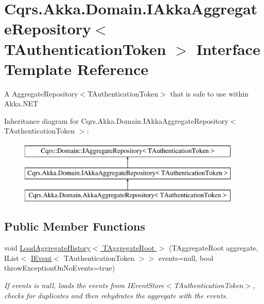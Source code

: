 \hypertarget{interfaceCqrs_1_1Akka_1_1Domain_1_1IAkkaAggregateRepository}{}\section{Cqrs.\+Akka.\+Domain.\+I\+Akka\+Aggregate\+Repository$<$ T\+Authentication\+Token $>$ Interface Template Reference}
\label{interfaceCqrs_1_1Akka_1_1Domain_1_1IAkkaAggregateRepository}


A Aggregate\+Repository$<$\+T\+Authentication\+Token$>$ that is safe to use within Akka.\+N\+ET  


Inheritance diagram for Cqrs.\+Akka.\+Domain.\+I\+Akka\+Aggregate\+Repository$<$ T\+Authentication\+Token $>$\+:\begin{figure}[H]
\begin{center}
\leavevmode
\includegraphics[height=3.000000cm]{interfaceCqrs_1_1Akka_1_1Domain_1_1IAkkaAggregateRepository}
\end{center}
\end{figure}
\subsection*{Public Member Functions}
\begin{DoxyCompactItemize}
\item 
void \hyperlink{interfaceCqrs_1_1Akka_1_1Domain_1_1IAkkaAggregateRepository_a9010b259daf5d09f7269277361015ddf_a9010b259daf5d09f7269277361015ddf}{Load\+Aggregate\+History$<$ T\+Aggregate\+Root $>$} (T\+Aggregate\+Root aggregate, I\+List$<$ \hyperlink{interfaceCqrs_1_1Events_1_1IEvent}{I\+Event}$<$ T\+Authentication\+Token $>$$>$ events=null, bool throw\+Exception\+On\+No\+Events=true)
\begin{DoxyCompactList}\small\item\em If {\itshape events}  is null, loads the events from I\+Event\+Store$<$\+T\+Authentication\+Token$>$, checks for duplicates and then rehydrates the {\itshape aggregate}  with the events. \end{DoxyCompactList}\end{DoxyCompactItemize}


